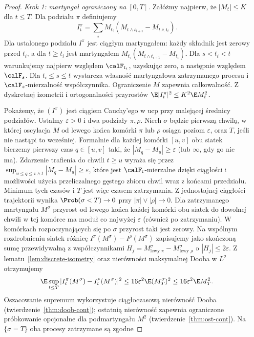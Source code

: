 \begin{proof}
\emph{Krok 1: martyngał ograniczony na $[0,T]$.}
Załóżmy najpierw, że $|M_t|\le K$ dla $t\le T$.
Dla podziału $\pi$ definiujemy
\[
I_t^\pi=\sum_i M_{t_i}
(M_{t\wedge t_{i+1}}-M_{t\wedge t_i}).
\]
Dla ustalonego podziału $I^\pi$ jest ciągłym martyngałem:
każdy składnik jest zerowy przed $t_i$, a dla
$t\ge t_i$ jest martyngałem $M_{t_i}(M_{t\wedge t_{i+1}}-M_{t_i})$.
Dla $s<t_i<t$ warunkujemy najpierw względem
$\calF_{t_i}$, uzyskując zero, a następnie względem
$\calF_s$. Dla $t_i\le s\le t$ wystarcza
własność martyngałowa zatrzymanego procesu i
$\calF_s$-mierzalność współczynnika.
Ograniczenie $M$ zapewnia całkowalność.
Z dyskretnej izometrii i ortogonalności przyrostów
$\E|I_t^\pi|^2\le K^2\E M_t^2$.

Pokażemy, że $(I^\pi)$ jest ciągiem Cauchy'ego w
ucp przy malejącej średnicy podziałów. Ustalmy
$\varepsilon>0$ i dwa podziały $\pi,\rho$.
Niech $\sigma$ będzie pierwszą chwilą, w której
oscylacja $M$ od lewego końca komórki $\pi$ lub
$\rho$ osiąga poziom $\varepsilon$, oraz $T$,
jeśli nie nastąpi to wcześniej. Formalnie dla każdej komórki $[u,v]$ obu siatek
bierzemy pierwszy czas $q\in[u,v]$ taki, że
$|M_q-M_u|\ge\varepsilon$ (lub $\infty$, gdy go nie ma).
Zdarzenie trafienia do chwili $t\ge u$ wyraża się przez
$\sup_{u\le q\le v\wedge t}|M_q-M_u|\ge\varepsilon$,
które jest $\calF_t$-mierzalne dzięki ciągłości
i możliwości użycia przeliczalnego gęstego zbioru
chwil wraz z końcami przedziału.
Minimum tych czasów i $T$ jest więc czasem zatrzymania.
Z jednostajnej ciągłości trajektorii wynika
$\Prob(\sigma<T)\to0$ przy
$|\pi|\vee|\rho|\to0$.
Dla zatrzymanego martyngału $M^\sigma$ przyrost
od lewego końca każdej komórki obu siatek
do dowolnej chwili w tej komórce ma moduł
co najwyżej $\varepsilon$ (również po zatrzymaniu).
W komórkach rozpoczynających się po $\sigma$
przyrost taki jest zerowy.
Na wspólnym rozdrobnieniu siatek różnicę
$I^\pi(M^\sigma)-I^\rho(M^\sigma)$ zapisujemy jako
skończoną sumę przewidywalną z współczynnikami
$H_j=M^\sigma_{\text{lewy }\pi}-
M^\sigma_{\text{lewy }\rho}$ o $|H_j|\le2\varepsilon$.
Z lematu~\ref{lem:discrete-isometry} oraz nierówności
maksymalnej Dooba w $L^2$ otrzymujemy
\[
\E\sup_{t\le T}|I_t^\pi(M^\sigma)-
I_t^\rho(M^\sigma)|^2
\le16\varepsilon^2\E (M^\sigma_T)^2
\le16\varepsilon^2\E M_T^2.
\]
Oszacowanie supremum wykorzystuje ciągłoczasową
nierówność Dooba (twierdzenie~\ref{thm:doob-cont});
ostatnią nierówność zapewnia ograniczone próbkowanie
opcjonalne dla podmartyngału $M^2$
(twierdzenie~\ref{thm:ost-cont}).
Na $\{\sigma=T\}$ oba procesy zatrzymane są zgodne

\end{proof}
